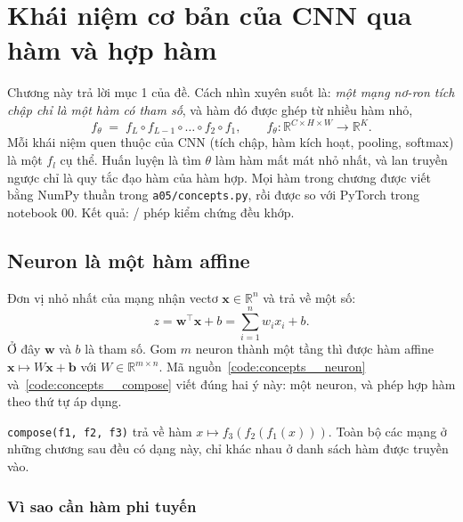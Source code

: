 \chapter{Khái niệm cơ bản của CNN qua hàm và hợp hàm}
\label{ch:khainiem}

Chương này trả lời mục 1 của đề. Cách nhìn xuyên suốt là: \emph{một mạng nơ-ron tích chập
chỉ là một hàm có tham số}, và hàm đó được ghép từ nhiều hàm nhỏ,
\[
  f_\theta \;=\; f_L \circ f_{L-1} \circ \dots \circ f_2 \circ f_1 ,
  \qquad f_\theta : \mathbb{R}^{C\times H\times W} \to \mathbb{R}^{K}.
\]
Mỗi khái niệm quen thuộc của CNN (tích chập, hàm kích hoạt, pooling, softmax) là một
$f_l$ cụ thể. Huấn luyện là tìm $\theta$ làm hàm mất mát nhỏ nhất, và lan truyền ngược chỉ là
quy tắc đạo hàm của hàm hợp. Mọi hàm trong chương được viết bằng NumPy thuần trong
\texttt{a05/concepts.py}, rồi được so với PyTorch trong notebook 00. Kết quả:
/ phép kiểm chứng đều khớp.

\section{Neuron là một hàm affine}

Đơn vị nhỏ nhất của mạng nhận vectơ $\mathbf{x}\in\mathbb{R}^n$ và trả về một số:
\[
  z = \mathbf{w}^{\top}\mathbf{x} + b = \sum_{i=1}^{n} w_i x_i + b .
\]
Ở đây $\mathbf{w}$ và $b$ là tham số. Gom $m$ neuron thành một tầng thì được hàm affine
$\mathbf{x}\mapsto W\mathbf{x}+\mathbf{b}$ với $W\in\mathbb{R}^{m\times n}$. Mã nguồn~\ref{code:concepts__neuron}
và~\ref{code:concepts__compose} viết đúng hai ý này: một neuron, và phép hợp hàm theo thứ tự áp dụng.


\noindent\texttt{compose(f1, f2, f3)} trả về hàm $x\mapsto f_3(f_2(f_1(x)))$. Toàn bộ các mạng ở những
chương sau đều có dạng này, chỉ khác nhau ở danh sách hàm được truyền vào.

\subsection*{Vì sao cần hàm phi tuyến}

